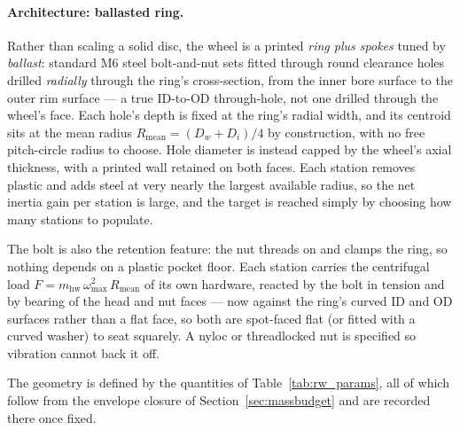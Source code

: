 \paragraph{Architecture: ballasted ring.} Rather than scaling a solid disc,
the wheel is a printed \emph{ring plus spokes} tuned by \emph{ballast}:
standard M6 steel bolt-and-nut sets fitted through round clearance holes
drilled \emph{radially} through the ring's cross-section, from the inner bore
surface to the outer rim surface --- a true ID-to-OD through-hole, not one
drilled through the wheel's face. Each hole's depth is fixed at the ring's
radial width, and its centroid sits at the mean radius
$R_{\text{mean}}=(D_w+D_i)/4$ by construction, with no free pitch-circle radius
to choose. Hole diameter is instead capped by the wheel's axial thickness, with
a printed wall retained on both faces. Each station removes plastic and adds
steel at very nearly the largest available radius, so the net inertia gain per
station is large, and the target is reached simply by choosing how many
stations to populate.

The bolt is also the retention feature: the nut threads on and clamps the
ring, so nothing depends on a plastic pocket floor. Each station carries the
centrifugal load $F=m_{\text{hw}}\,\omega_{\max}^2\,R_{\text{mean}}$ of its own
hardware, reacted by the bolt in tension and by bearing of the head and nut
faces --- now against the ring's curved ID and OD surfaces rather than a flat
face, so both are spot-faced flat (or fitted with a curved washer) to seat
squarely. A nyloc or threadlocked nut is specified so vibration cannot back it
off.

The geometry is defined by the quantities of Table~\ref{tab:rw_params}, all of
which follow from the envelope closure of Section~\ref{sec:massbudget} and are
recorded there once fixed.

